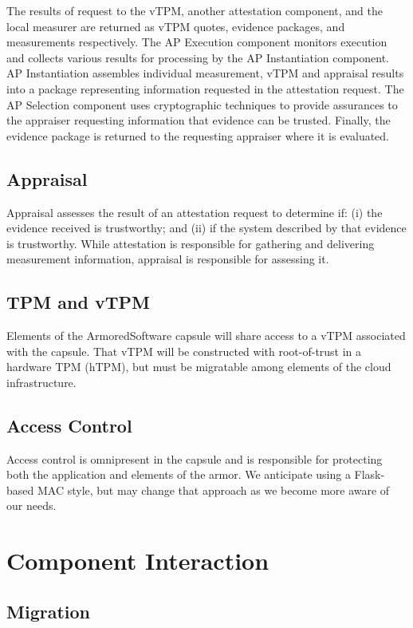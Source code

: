 \documentclass[10pt]{article}
\begin{document}
The results of request to the vTPM, another attestation component, and
the local measurer are returned as vTPM quotes, evidence packages, and
measurements respectively.  The AP Execution component monitors
execution and collects various results for processing by the AP
Instantiation component.  AP Instantiation assembles individual
measurement, vTPM and appraisal results into a package representing
information requested in the attestation request.  The AP Selection
component uses cryptographic techniques to provide assurances to the
appraiser requesting information that evidence can be trusted.
Finally, the evidence package is returned to the requesting appraiser
where it is evaluated.

\subsection{Appraisal}

Appraisal assesses the result of an attestation request to determine
if: (i) the evidence received is trustworthy; and (ii) if the
system described by that evidence is trustworthy.  While attestation
is responsible for gathering and delivering measurement information,
appraisal is responsible for assessing it.

\subsection{TPM and vTPM}

Elements of the ArmoredSoftware capsule will share access to a vTPM
associated with the capsule.  That vTPM will be constructed with
root-of-trust in a hardware TPM (hTPM), but must be migratable among
elements of the cloud infrastructure.

\subsection{Access Control}

Access control is omnipresent in the capsule and is responsible for
protecting both the application and elements of the armor.  We
anticipate using a Flask-based MAC style, but may change that approach
as we become more aware of our needs.

\section{Component Interaction}

\subsection{Migration}

\appendix




\end{document}
